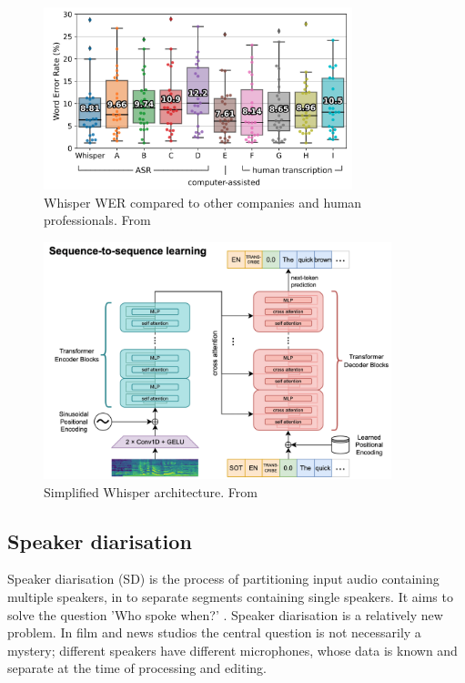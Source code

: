 \documentclass[twoside]{uva-inf-bachelor-thesis}
\begin{document}
\begin{figure}
    \centering
    \includegraphics[width=0.8\textwidth]{images/whisperwer.png}
    \caption{Whisper WER compared to other companies and human professionals. From \cite{radford2023robust}}
    \label{fig:whisperwer}
\end{figure}

\begin{figure}
    \centering
    \includegraphics[width=0.9\textwidth]{images/whisperarch.png}
    \caption{Simplified Whisper architecture. From \cite{radford2023robust}}
    \label{fig:whisperarch}
\end{figure}

\subsection{Speaker diarisation}
Speaker diarisation (SD) is the process of partitioning input audio containing multiple speakers, in to separate segments containing single speakers. It aims to solve the question 'Who spoke when?' \cite{sahidullah2019speed}. Speaker diarisation is a relatively new problem. In film and news studios the central question is not necessarily a mystery; different speakers have different microphones, whose data is known and separate at the time of processing and editing. 
\end{document}
